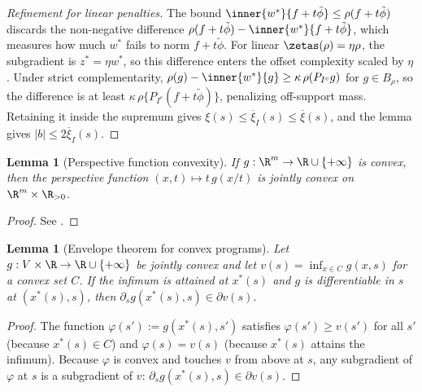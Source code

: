 \documentclass{article}
\newtheorem{lemma}[theorem]{Lemma}
\begin{document}
\begin{proof}[Refinement for linear penalties]
The bound $\inner{w^*}{f + t\tilde\phi} \le \rho(f + t\tilde\phi)$ discards the non-negative difference $\rho(f + t\tilde\phi) - \inner{w^*}{f + t\tilde\phi}$, which measures how much $w^*$ fails to norm $f + t\tilde\phi$. For linear $\zetas(\rho) = \eta\rho$, the subgradient is $z^* = \eta w^*$, so this difference enters the offset complexity scaled by $\eta$. Under strict complementarity, $\rho(g) - \inner{w^*}{g} \ge \kappa\,\rho(P_{I^c} g)$ for $g \in B_\rho$, so the difference is at least $\kappa\,\rho\{P_{I^c}(f + t\tilde\phi)\}$, penalizing off-support mass. Retaining it inside the supremum gives $\xi(s) \le \overline\xi_I(s) \le \overline\xi(s)$, and the lemma gives $|b| \le 2\overline\xi_I(s)$.
\end{proof}

\begin{lemma}[Perspective function convexity]
\label{lem:perspective-convexity}
If $g: \R^m \to \R \cup \{+\infty\}$ is convex,
then the perspective function
$(x, t) \mapsto t\, g(x/t)$
is jointly convex on $\R^m \times \R_{>0}$.
\end{lemma}
\begin{proof}
See \citet[Section~3.2.6]{boyd2004convex}.
\end{proof}

\begin{lemma}[Envelope theorem for convex programs]
\label{lem:envelope-theorem}
Let $g: V \times \R \to \R \cup \{+\infty\}$
be jointly convex
and let $v(s) = \inf_{x \in C} g(x, s)$
for a convex set $C$.
If the infimum is attained at $x^*(s)$
and $g$ is differentiable in $s$ at $(x^*(s), s)$,
then $\partial_s g(x^*(s), s) \in \partial v(s)$.
\end{lemma}
\begin{proof}
The function $\varphi(s') := g(x^*(s), s')$
satisfies $\varphi(s') \ge v(s')$ for all $s'$
(because $x^*(s) \in C$)
and $\varphi(s) = v(s)$
(because $x^*(s)$ attains the infimum).
Because $\varphi$ is convex
and touches $v$ from above at $s$,
any subgradient of $\varphi$ at $s$
is a subgradient of $v$:
$\partial_s g(x^*(s), s) \in \partial v(s)$.
\end{proof}
\end{document}

